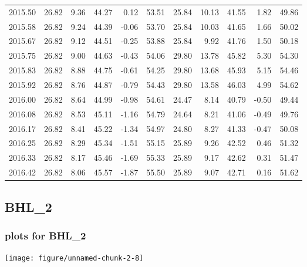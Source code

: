 \documentclass[10pt,a4paper]{article}\usepackage[]{graphicx}\usepackage[]{color}
\makeatletter
\def\maxwidth{ %
  \ifdim\Gin@nat@width>\linewidth
    \linewidth
  \else
    \Gin@nat@width
  \fi
}
\newcommand{\AaA}{\_}
\makeatother
\begin{document}
\begin{table}[ht]
\begin{tabular}{rrrrrrrrrrr}
  2015.50 & 26.82 & 9.36 & 44.27 & 0.12 & 53.51 & 25.84 & 10.13 & 41.55 & 1.82 & 49.86 \\ 
  2015.58 & 26.82 & 9.24 & 44.39 & -0.06 & 53.70 & 25.84 & 10.03 & 41.65 & 1.66 & 50.02 \\ 
  2015.67 & 26.82 & 9.12 & 44.51 & -0.25 & 53.88 & 25.84 & 9.92 & 41.76 & 1.50 & 50.18 \\ 
  2015.75 & 26.82 & 9.00 & 44.63 & -0.43 & 54.06 & 29.80 & 13.78 & 45.82 & 5.30 & 54.30 \\ 
  2015.83 & 26.82 & 8.88 & 44.75 & -0.61 & 54.25 & 29.80 & 13.68 & 45.93 & 5.15 & 54.46 \\ 
  2015.92 & 26.82 & 8.76 & 44.87 & -0.79 & 54.43 & 29.80 & 13.58 & 46.03 & 4.99 & 54.62 \\ 
  2016.00 & 26.82 & 8.64 & 44.99 & -0.98 & 54.61 & 24.47 & 8.14 & 40.79 & -0.50 & 49.44 \\ 
  2016.08 & 26.82 & 8.53 & 45.11 & -1.16 & 54.79 & 24.64 & 8.21 & 41.06 & -0.49 & 49.76 \\ 
  2016.17 & 26.82 & 8.41 & 45.22 & -1.34 & 54.97 & 24.80 & 8.27 & 41.33 & -0.47 & 50.08 \\ 
  2016.25 & 26.82 & 8.29 & 45.34 & -1.51 & 55.15 & 25.89 & 9.26 & 42.52 & 0.46 & 51.32 \\ 
  2016.33 & 26.82 & 8.17 & 45.46 & -1.69 & 55.33 & 25.89 & 9.17 & 42.62 & 0.31 & 51.47 \\ 
  2016.42 & 26.82 & 8.06 & 45.57 & -1.87 & 55.50 & 25.89 & 9.07 & 42.71 & 0.16 & 51.62 \\ 
   \hline
\end{tabular}
\end{table}

\newpage
\subsection{BHL\AaA 2}
\subsubsection{plots for BHL\AaA 2}

\texttt{[image: figure/unnamed-chunk-2-8]} 

\newpage
\end{document}
